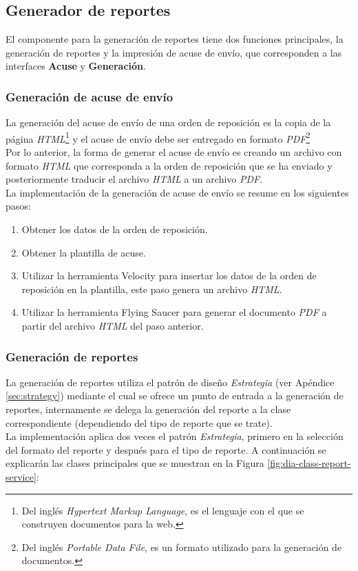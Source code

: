 \subsection{Generador de reportes}
El componente para la generación de reportes tiene dos funciones principales, la generación de reportes y la impresión de acuse de envío, que corresponden a las interfaces \textbf{Acuse} y \textbf{Generación}.

\subsubsection{Generación de acuse de envío}\label{sec:gen-acuse}
La generación del acuse de envío de una orden de reposición es la copia de la página \textit{HTML}\footnote{Del inglés \textit{Hypertext Markup Language}, es el lenguaje con el que se construyen documentos para la web\cite{HTMLCSSCompleteReference}.} y el acuse de envío debe ser entregado en formato \textit{PDF}\footnote{Del inglés \textit{Portable Data File}, es un formato utilizado para la generación de documentos\cite{iTextInAction}.}\\
Por lo anterior, la forma de generar el acuse de envío es creando un archivo con formato \textit{HTML} que corresponda a la orden de reposición que se ha enviado y posteriormente traducir el archivo \textit{HTML} a un archivo \textit{PDF}.\\
La implementación de la generación de acuse de envío se resume en los siguientes pasos:
\begin{enumerate}
	\item Obtener los datos de la orden de reposición.
	\item Obtener la plantilla de acuse.
	\item Utilizar la herramienta Velocity para insertar los datos de la orden de reposición en la plantilla, este paso genera un archivo \textit{HTML}.
	\item Utilizar la herramienta Flying Saucer para generar el documento \textit{PDF} a partir del archivo \textit{HTML} del paso anterior.
\end{enumerate}

\subsubsection{Generación de reportes}\label{sec:gen-repport}
La generación de reportes utiliza el patrón de diseño \textit{Estrategia} (ver Apéndice \ref{sec:strategy}) mediante el cual se ofrece un punto de entrada a la generación de reportes, internamente se delega la generación del reporte a la clase correspondiente (dependiendo del tipo de reporte que se trate).\\
La implementación aplica dos veces el patrón \textit{Estrategia}, primero en la selección del formato del reporte y después para el tipo de reporte. A continuación se explicarán las clases principales que se muestran en la Figura \ref{fig:dia-class-report-service}:

